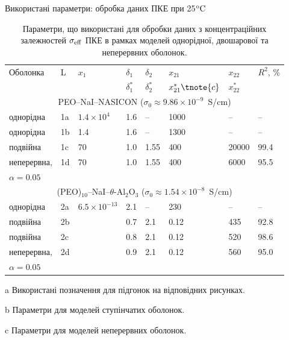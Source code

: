 \documentclass[10pt]{beamer}
\begin{document}
\begin{frame}{Використані параметри: обробка даних ПКЕ при 25$\rm ^{o}C$}
\footnotesize

\begin{table}[tb]
	\centering 
	\caption{\label{tab:adjustable_params-1} Параметри, що
		використані для обробки даних з 
		концентраційних залежностей $\sigma_{\rm eff}$ ПКЕ в 
		рамках моделей однорідної, двошарової
		та неперервних оболонок.}
	\vspace{-10pt}
	\begin{threeparttable}
		\begin{tabular}{|l|l|l|l|l|l|l|l|}
			\hline
			\multirow{2}{*}{Оболонка} &\multirow{2}{*}{L\tnote{a}} &   \multirow{2}{*}{$x_1$} & $\delta_1$\tnote{b} & $\delta_2$\tnote{b}  & $x_{21}$\tnote{b} & $x_{22}$\tnote{b} &  \multirow{2}{*}{$R^2$, \%} \\
			&  & & $\delta^\ast_1$\tnote{c}& $\delta^\ast_2$\tnote{c}&$x^\ast_{21}\tnote{c}$&$x^\ast_{22}$\tnote{c} & \\
			\hline
			\multicolumn{8}{c}{PEO--NaI--NASICON ($\sigma_0 \approx 9.86\times 10^{-9}$~S/cm)}\\
			\hline
			однорідна  &1a   & $1.4\times 10^4$ &1.6& -- &  1000& -- & --  \\
			однорідна                 &1b                                       &1.4             &1.6& -- &  1300& -- & --  \\
			подвійна                 &1c                                       &70              &1.0&1.55&  400  &  20000 &  99.4 \\
			неперервна, &1d                   &70              &1.0&1.55&  400 &  6000 &  95.5 \\
			$\alpha =0.05$   & & & & & &  &   \\
			\hline
			\multicolumn{8}{c}{(PEO)$_{10}$--NaI--$\theta$-Al$_2$O$_3$ ($\sigma_0 \approx 1.54\times 10^{-8}$~S/cm)}\\
			\hline
			однорідна &2a & \multirow{5}{*}{$6.5\times 10^{-13}$} &2.1&--&230&--&--  \\
			подвійна &2b                                       &                   &0.7&2.1&0.12&435& 92.8\\
			подвійна &2c                                       &                   &0.8&2.1&0.12&520& 98.6\\
			неперервна, &2d                                  &                   &0.9&2.1&0.12&560& 95.0\\
			$\alpha =0.05$  &  &  & & & &  &   \\
			\hline
		\end{tabular}
		\begin{tablenotes}
			\item[a] Використані позначення для підгонок на відповідних
			рисунках.
			\item[b] Параметри для моделей ступінчатих оболонок.
			\item[c] Параметри для моделей неперервних оболонок.
		\end{tablenotes}
	\end{threeparttable}
\end{table}


\end{frame}
\end{document}
